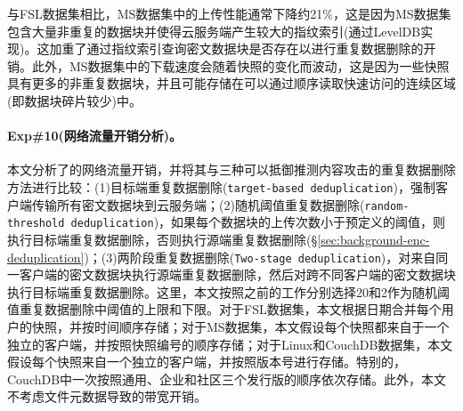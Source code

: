 与FSL数据集相比，MS数据集中的上传性能通常下降约21\%，这是因为MS数据集包含大量非重复的数据块并使得云服务端产生较大的指纹索引(通过LevelDB\cite{leveldb}实现)。这加重了通过指纹索引查询密文数据块是否存在以进行重复数据删除的开销。此外，MS数据集中的下载速度会随着快照的变化而波动，这是因为一些快照具有更多的非重复数据块，并且可能存储在可以通过顺序读取快速访问的连续区域(即数据块碎片较少\cite{lillibridge13})中。

\paragraph*{Exp\#10(网络流量开销分析)。}
本文分析了\prototype 的网络流量开销，并将其与三种可以抵御推测内容攻击的重复数据删除方法进行比较：(1)目标端重复数据删除({\tt target-based deduplication})\cite{harnik2010side}，强制客户端传输所有密文数据块到云服务端；(2)随机阈值重复数据删除({\tt random-threshold deduplication})\cite{harnik2010side}，如果每个数据块的上传次数小于预定义的阈值，则执行目标端重复数据删除，否则执行源端重复数据删除(\S\ref{sec:background-enc-deduplication})；(3)两阶段重复数据删除({\tt Two-stage deduplication})\cite{li15}，对来自同一客户端的密文数据块执行源端重复数据删除，然后对跨不同客户端的密文数据块执行目标端重复数据删除。这里，本文按照之前的工作\cite{harnik2010side}分别选择20和2作为随机阈值重复数据删除中阈值的上限和下限。对于FSL数据集，本文根据日期合并每个用户的快照，并按时间顺序存储；对于MS数据集，本文假设每个快照都来自于一个独立的客户端，并按照快照编号的顺序存储；对于Linux和CouchDB数据集，本文假设每个快照来自一个独立的客户端，并按照版本号进行存储。特别的，CouchDB中一次按照通用、企业和社区三个发行版的顺序依次存储。此外，本文不考虑文件元数据导致的带宽开销。

